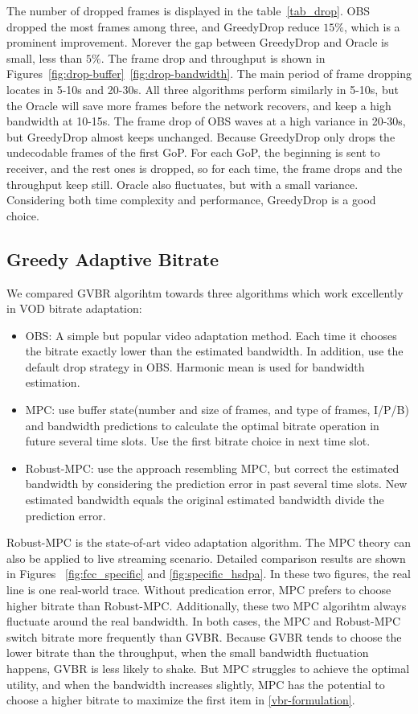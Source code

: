 

The number of dropped frames is displayed in the table~\ref{tab_drop}. OBS dropped the most frames among three, and GreedyDrop reduce $15\%$, which is a prominent improvement. Morever the gap between GreedyDrop and Oracle is small, less than $5\%$. The frame drop and throughput is shown in Figures~\ref{fig:drop-buffer}~\ref{fig:drop-bandwidth}. The main period of frame dropping locates in 5-10s and 20-30s. All three algorithms perform similarly in 5-10s, but the Oracle will save more frames before the network recovers, and keep a high bandwidth at 10-15s. The frame drop of OBS waves at a high variance in 20-30s, but GreedyDrop almost keeps unchanged. Because GreedyDrop only drops the undecodable frames of the first GoP. For each GoP, the beginning is sent to receiver, and the rest ones is dropped, so for each time, the frame drops and the throughput keep still. Oracle also fluctuates, but with a small variance. Considering both time complexity and performance, GreedyDrop is a good choice.


\subsection{Greedy Adaptive Bitrate}

We compared GVBR algorihtm towards three algorithms which work excellently in VOD bitrate adaptation:
\begin{itemize}
  \item OBS: A simple but popular video adaptation method. Each time it chooses the bitrate exactly lower than the estimated bandwidth. In addition, use the default drop strategy in OBS. Harmonic mean is used for bandwidth estimation.
  \item MPC: use buffer state(number and size of frames, and type of frames, I/P/B) and bandwidth predictions to calculate the optimal bitrate operation in future several time slots. Use the first bitrate choice in next time slot.
  \item Robust-MPC: use the approach resembling MPC, but correct the estimated bandwidth by considering the prediction error in past several time slots. New estimated bandwidth equals the original estimated bandwidth divide the prediction error.
\end{itemize}
Robust-MPC is the state-of-art video adaptation algorithm. The MPC theory can also be applied to live streaming scenario.
Detailed comparison results are shown in Figures ~\ref{fig:fcc_specific} and \ref{fig:specific_hsdpa}. In these two figures, the real line is one real-world trace. Without predication error, MPC prefers to choose higher bitrate than Robust-MPC. Additionally, these two MPC algorihtm always fluctuate around the real bandwidth. In both cases, the MPC and Robust-MPC switch bitrate more frequently than GVBR. Because GVBR tends to choose the lower bitrate than the throughput, when the small bandwidth fluctuation happens, GVBR is less likely to shake. But MPC struggles to achieve the optimal utility, and when the bandwidth increases slightly, MPC has the potential to choose a higher bitrate to maximize the first item in \ref{vbr-formulation}.

